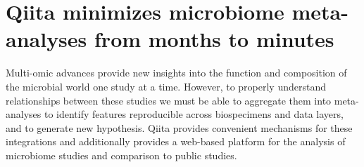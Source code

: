 \glsresetall

\section{Qiita minimizes microbiome meta-analyses from months to minutes}\label{section_qiita}

Multi-omic advances provide new insights into the function and composition of the
microbial world one study at a time. However, to properly understand relationships
between these studies we must be able to aggregate them into meta-analyses to
identify features reproducible across biospecimens and data layers, and to
generate new hypothesis. Qiita provides convenient mechanisms for these integrations
and additionally provides a web-based platform for the analysis of microbiome
studies and comparison to public studies.

